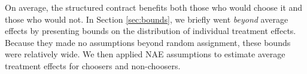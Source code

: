 \documentclass[12pt, a4paper, colorinlistoftodos]{article}
\begin{document}
%




On average, the structured contract benefits both those who would choose it and those who would not.
In Section \ref{sec:bounds}, we briefly went \emph{beyond} average effects by presenting bounds on the distribution of individual treatment effects.
Because they made no assumptions beyond random assignment, these bounds were relatively wide.
We then applied NAE assumptions to estimate average treatment effects for choosers and non-choosers. 
\end{document}
